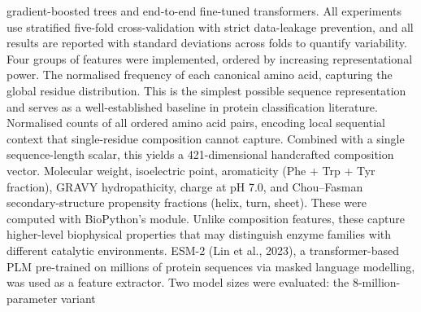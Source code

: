 {}gradient-boosted trees and end-to-end fine-tuned transformers. All experiments use stratified\markdownRendererSoftLineBreak
{}five-fold cross-validation with strict data-leakage prevention, and all results are reported\markdownRendererSoftLineBreak
{}with standard deviations across folds to quantify variability.\markdownRendererInterblockSeparator
{}
\markdownRendererSectionEnd \markdownRendererSectionBegin
{}\markdownRendererInterblockSeparator
{}\markdownRendererSectionBegin
{}\markdownRendererInterblockSeparator
{}Four groups of features were implemented, ordered by increasing representational power.\markdownRendererParagraphSeparator
{} The normalised frequency of each canonical amino acid,\markdownRendererSoftLineBreak
{}capturing the global residue distribution. This is the simplest possible sequence\markdownRendererSoftLineBreak
{}representation and serves as a well-established baseline in protein classification literature.\markdownRendererParagraphSeparator
{} Normalised counts of all ordered amino acid pairs,\markdownRendererSoftLineBreak
{}encoding local sequential context that single-residue composition cannot capture. Combined\markdownRendererSoftLineBreak
{}with a single sequence-length scalar, this yields a 421-dimensional handcrafted composition\markdownRendererSoftLineBreak
{}vector.\markdownRendererParagraphSeparator
{} Molecular weight, isoelectric point, aromaticity\markdownRendererSoftLineBreak
{}(Phe + Trp + Tyr fraction), GRAVY hydropathicity, charge at pH 7.0, and Chou–Fasman\markdownRendererSoftLineBreak
{}secondary-structure propensity fractions (helix, turn, sheet). These were computed with\markdownRendererSoftLineBreak
{}BioPython's  module. Unlike composition features, these capture higher-level\markdownRendererSoftLineBreak
{}biophysical properties that may distinguish enzyme families with different catalytic\markdownRendererSoftLineBreak
{}environments.\markdownRendererParagraphSeparator
{} ESM-2 (Lin et al., 2023), a transformer-based PLM\markdownRendererSoftLineBreak
{}pre-trained on millions of protein sequences via masked language modelling, was used as a\markdownRendererSoftLineBreak
{}feature extractor. Two model sizes were evaluated: the 8-million-parameter variant\markdownRendererSoftLineBreak
